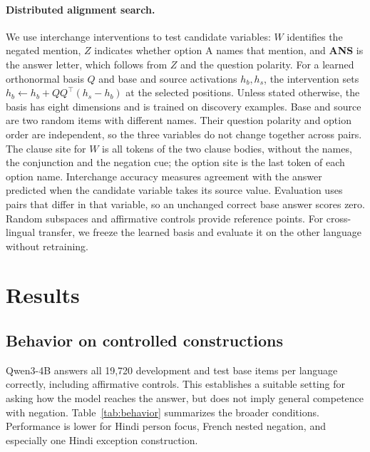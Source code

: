 \documentclass[11pt]{article}
\begin{document}
\paragraph{Distributed alignment search.} We use interchange interventions \citep{geiger2021abstraction,geiger2024das,wu2023scale} to test candidate variables: $W$ identifies the negated mention, $Z$ indicates whether option A names that mention, and \textbf{ANS} is the answer letter, which follows from $Z$ and the question polarity. For a learned orthonormal basis $Q$ and base and source activations $h_b,h_s$, the intervention sets $h_b\leftarrow h_b+QQ^\top(h_s-h_b)$ at the selected positions. Unless stated otherwise, the basis has eight dimensions and is trained on discovery examples. Base and source are two random items with different names. Their question polarity and option order are independent, so the three variables do not change together across pairs. The clause site for $W$ is all tokens of the two clause bodies, without the names, the conjunction and the negation cue; the option site is the last token of each option name. Interchange accuracy measures agreement with the answer predicted when the candidate variable takes its source value. Evaluation uses pairs that differ in that variable, so an unchanged correct base answer scores zero. Random subspaces and affirmative controls provide reference points. For cross-lingual transfer, we freeze the learned basis and evaluate it on the other language without retraining.

\section{Results}
\label{sec:results}
\subsection{Behavior on controlled constructions}
\label{sec:behavior}
Qwen3-4B answers all 19,720 development and test base items per language correctly, including affirmative controls. This establishes a suitable setting for asking how the model reaches the answer, but does not imply general competence with negation. Table~\ref{tab:behavior} summarizes the broader conditions. Performance is lower for Hindi person focus, French nested negation, and especially one Hindi exception construction.
\end{document}
